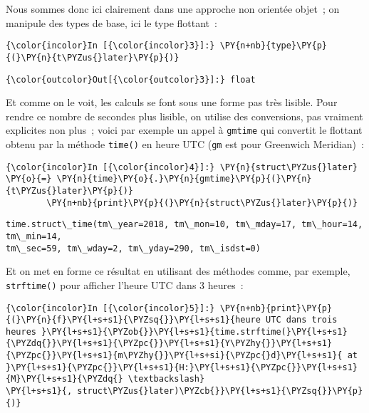    Nous sommes donc ici clairement dans une approche non orientée objet~;
on manipule des types de base, ici le type flottant~:

    \begin{Verbatim}[commandchars=\\\{\}]
{\color{incolor}In [{\color{incolor}3}]:} \PY{n+nb}{type}\PY{p}{(}\PY{n}{t\PYZus{}later}\PY{p}{)}
\end{Verbatim}


\begin{Verbatim}[commandchars=\\\{\}]
{\color{outcolor}Out[{\color{outcolor}3}]:} float
\end{Verbatim}
            
    Et comme on le voit, les calculs se font sous une forme pas très
lisible. Pour rendre ce nombre de secondes plus lisible, on utilise des
conversions, pas vraiment explicites non plus~; voici par exemple un
appel à \texttt{gmtime} qui convertit le flottant obtenu par la méthode
\texttt{time()} en heure UTC (\texttt{gm} est pour Greenwich Meridian)~:

    \begin{Verbatim}[commandchars=\\\{\}]
{\color{incolor}In [{\color{incolor}4}]:} \PY{n}{struct\PYZus{}later} \PY{o}{=} \PY{n}{time}\PY{o}{.}\PY{n}{gmtime}\PY{p}{(}\PY{n}{t\PYZus{}later}\PY{p}{)}
        \PY{n+nb}{print}\PY{p}{(}\PY{n}{struct\PYZus{}later}\PY{p}{)}
\end{Verbatim}


    \begin{Verbatim}[commandchars=\\\{\}]
time.struct\_time(tm\_year=2018, tm\_mon=10, tm\_mday=17, tm\_hour=14, tm\_min=14,
tm\_sec=59, tm\_wday=2, tm\_yday=290, tm\_isdst=0)

    \end{Verbatim}

    Et on met en forme ce résultat en utilisant des méthodes comme, par
exemple, \texttt{strftime()} pour afficher l'heure UTC dans 3 heures~:

    \begin{Verbatim}[commandchars=\\\{\}]
{\color{incolor}In [{\color{incolor}5}]:} \PY{n+nb}{print}\PY{p}{(}\PY{n}{f}\PY{l+s+s1}{\PYZsq{}}\PY{l+s+s1}{heure UTC dans trois heures }\PY{l+s+s1}{\PYZob{}}\PY{l+s+s1}{time.strftime(}\PY{l+s+s1}{\PYZdq{}}\PY{l+s+s1}{\PYZpc{}}\PY{l+s+s1}{Y\PYZhy{}}\PY{l+s+s1}{\PYZpc{}}\PY{l+s+s1}{m\PYZhy{}}\PY{l+s+si}{\PYZpc{}d}\PY{l+s+s1}{ at }\PY{l+s+s1}{\PYZpc{}}\PY{l+s+s1}{H:}\PY{l+s+s1}{\PYZpc{}}\PY{l+s+s1}{M}\PY{l+s+s1}{\PYZdq{} \textbackslash}
\PY{l+s+s1}{, struct\PYZus{}later)\PYZcb{}}\PY{l+s+s1}{\PYZsq{}}\PY{p}{)}
\end{Verbatim}


